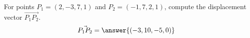 \begin{problem}
For points $P_1=(2,-3,7,1)$ and $P_2=(-1,7,2,1)$, compute the displacement vector $\vec{P_1P_2}$.
\[
\vec{P_1P_2} = \answer{(-3,10,-5,0)}
\]
\end{problem}